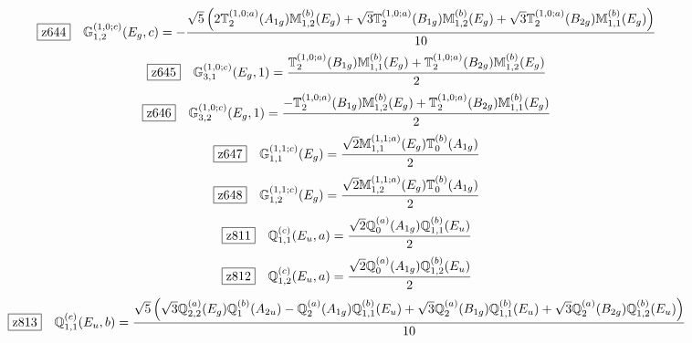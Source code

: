 \documentclass[fleqn,10pt,landscape]{jsarticle}
\begin{document}
\begin{dmath*}
\hspace*{3mm}\fbox{z644}\quad \mathbb{G}_{1,2}^{(1,0;c)}(E_{g},c)=- \frac{\sqrt{5} \left(2 \mathbb{T}_{2}^{(1,0;a)}(A_{1g}) \mathbb{M}_{1,2}^{(b)}(E_{g}) + \sqrt{3} \mathbb{T}_{2}^{(1,0;a)}(B_{1g}) \mathbb{M}_{1,2}^{(b)}(E_{g}) + \sqrt{3} \mathbb{T}_{2}^{(1,0;a)}(B_{2g}) \mathbb{M}_{1,1}^{(b)}(E_{g})\right)}{10}
\end{dmath*}
\begin{dmath*}
\hspace*{3mm}\fbox{z645}\quad \mathbb{G}_{3,1}^{(1,0;c)}(E_{g},1)=\frac{\mathbb{T}_{2}^{(1,0;a)}(B_{1g}) \mathbb{M}_{1,1}^{(b)}(E_{g}) + \mathbb{T}_{2}^{(1,0;a)}(B_{2g}) \mathbb{M}_{1,2}^{(b)}(E_{g})}{2}
\end{dmath*}
\begin{dmath*}
\hspace*{3mm}\fbox{z646}\quad \mathbb{G}_{3,2}^{(1,0;c)}(E_{g},1)=\frac{- \mathbb{T}_{2}^{(1,0;a)}(B_{1g}) \mathbb{M}_{1,2}^{(b)}(E_{g}) + \mathbb{T}_{2}^{(1,0;a)}(B_{2g}) \mathbb{M}_{1,1}^{(b)}(E_{g})}{2}
\end{dmath*}
\begin{dmath*}
\hspace*{3mm}\fbox{z647}\quad \mathbb{G}_{1,1}^{(1,1;c)}(E_{g})=\frac{\sqrt{2} \mathbb{M}_{1,1}^{(1,1;a)}(E_{g}) \mathbb{T}_{0}^{(b)}(A_{1g})}{2}
\end{dmath*}
\begin{dmath*}
\hspace*{3mm}\fbox{z648}\quad \mathbb{G}_{1,2}^{(1,1;c)}(E_{g})=\frac{\sqrt{2} \mathbb{M}_{1,2}^{(1,1;a)}(E_{g}) \mathbb{T}_{0}^{(b)}(A_{1g})}{2}
\end{dmath*}
\begin{dmath*}
\hspace*{3mm}\fbox{z811}\quad \mathbb{Q}_{1,1}^{(c)}(E_{u},a)=\frac{\sqrt{2} \mathbb{Q}_{0}^{(a)}(A_{1g}) \mathbb{Q}_{1,1}^{(b)}(E_{u})}{2}
\end{dmath*}
\begin{dmath*}
\hspace*{3mm}\fbox{z812}\quad \mathbb{Q}_{1,2}^{(c)}(E_{u},a)=\frac{\sqrt{2} \mathbb{Q}_{0}^{(a)}(A_{1g}) \mathbb{Q}_{1,2}^{(b)}(E_{u})}{2}
\end{dmath*}
\begin{dmath*}
\hspace*{3mm}\fbox{z813}\quad \mathbb{Q}_{1,1}^{(c)}(E_{u},b)=\frac{\sqrt{5} \left(\sqrt{3} \mathbb{Q}_{2,2}^{(a)}(E_{g}) \mathbb{Q}_{1}^{(b)}(A_{2u}) - \mathbb{Q}_{2}^{(a)}(A_{1g}) \mathbb{Q}_{1,1}^{(b)}(E_{u}) + \sqrt{3} \mathbb{Q}_{2}^{(a)}(B_{1g}) \mathbb{Q}_{1,1}^{(b)}(E_{u}) + \sqrt{3} \mathbb{Q}_{2}^{(a)}(B_{2g}) \mathbb{Q}_{1,2}^{(b)}(E_{u})\right)}{10}
\end{dmath*}
\end{document}
